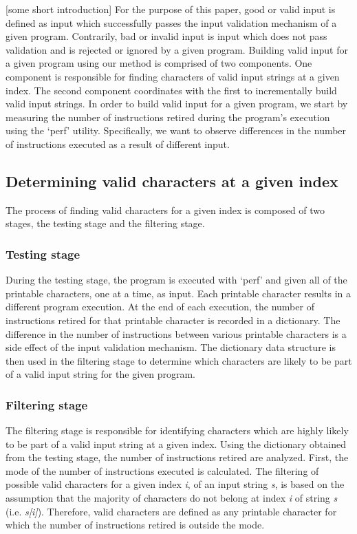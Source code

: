 \documentclass[11pt,twocolumn]{article}
\begin{document}
[some short introduction]
For the purpose of this paper, good or valid input is defined as input which successfully passes the input validation mechanism of a given program.
Contrarily, bad or invalid input is input which does not pass validation and is rejected or ignored by a given program.
Building valid input for a given program using our method is comprised of two components.
One component is responsible for finding characters of valid input strings at a given index.
The second component coordinates with the first to incrementally build valid input strings.
In order to build valid input for a given program, we start by measuring the number of instructions retired during the program's execution using the `perf' utility.
Specifically, we want to observe differences in the number of instructions executed as a result of different input.

\subsection{Determining valid characters at a given index}

The process of finding valid characters for a given index is composed of two stages, the testing stage and the filtering stage.

\subsubsection{Testing stage}

During the testing stage, the program is executed with `perf' and given all of the printable characters, one at a time, as input.
Each printable character results in a different program execution.
At the end of each execution, the number of instructions retired for that printable character is recorded in a dictionary.
The difference in the number of instructions between various printable characters is a side effect of the input validation mechanism.
The dictionary data structure is then used in the filtering stage to determine which characters are likely to be part of a valid input string for the given program.

\subsubsection{Filtering stage}

The filtering stage is responsible for identifying characters which are highly likely to be part of a valid input string at a given index.
Using the dictionary obtained from the testing stage, the number of instructions retired are analyzed.
First, the mode of the number of instructions executed is calculated.
The filtering of possible valid characters for a given index \textit{i}, of an input string \textit{s}, is based on the assumption that the majority of characters do not belong at index \textit{i} of string \textit{s} (i.e. \textit{s[i]}).
Therefore, valid characters are defined as any printable character for which the number of instructions retired is outside the mode.
\end{document}
